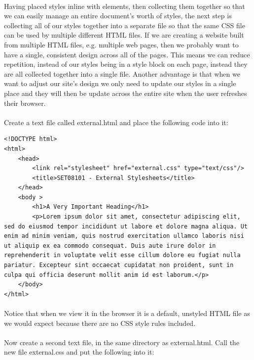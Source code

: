 \documentclass[10pt, a4paper, twosize]{article}
\begin{document}
\paragraph{} Having placed styles inline with elements, then collecting them together so that we can easily manage an entire document's worth of styles, the next step is collecting all of our styles together into a separate file so that the same CSS file can be used by multiple different HTML files. If we are creating a website built from multiple HTML files, e.g. multiple web pages, then we probably want to have a single, consistent design across all of the pages. This means we can reduce repetition, instead of our styles being in a style block on each page, instead they are all collected together into a single file. Another advantage is that when we want to adjust our site's design we only need to update our styles in a single place and they will then be update across the entire site when the user refreshes their browser.

\paragraph{} Create a text file called external.html and place the following code into it:

\begin{lstlisting}
<!DOCTYPE html>
<html>
    <head>
        <link rel="stylesheet" href="external.css" type="text/css"/>
        <title>SET08101 - External Stylesheets</title>
    </head>
    <body >
        <h1>A Very Important Heading</h1>
        <p>Lorem ipsum dolor sit amet, consectetur adipiscing elit, sed do eiusmod tempor incididunt ut labore et dolore magna aliqua. Ut enim ad minim veniam, quis nostrud exercitation ullamco laboris nisi ut aliquip ex ea commodo consequat. Duis aute irure dolor in reprehenderit in voluptate velit esse cillum dolore eu fugiat nulla pariatur. Excepteur sint occaecat cupidatat non proident, sunt in culpa qui officia deserunt mollit anim id est laborum.</p>
    </body>
</html>
\end{lstlisting}

\paragraph{} Notice that when we view it in the browser it is a default, unstyled HTML file as we would expect because there are no CSS style rules included. 

\paragraph{} Now create a second text file, in the same directory as external.html. Call the new file external.css and put the following into it:
\end{document}

